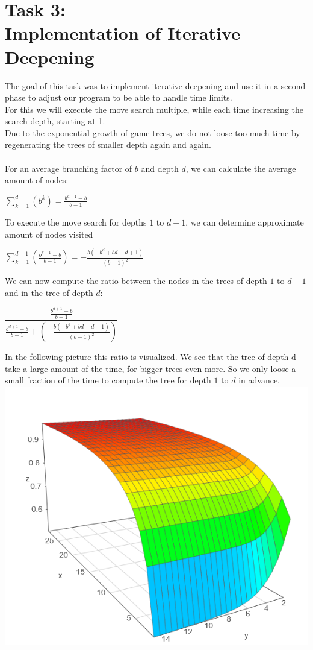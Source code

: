\section{Task 3: \\ Implementation of Iterative Deepening}
The goal of this task was to implement iterative deepening and use it in a second phase to adjust our program to be able to handle time limits.\\
For this we will execute the move search multiple, while each time increasing the search depth, starting at 1.\\
Due to the exponential growth of game trees, we do not loose too much time by regenerating the trees of smaller depth again and again.\\\\
For an average branching factor of $b$ and depth $d$, we can calculate the average amount of nodes:\\
\begin{center}
	${\displaystyle \sum_{k=1}^{d}(b^{k})} = \frac{b^{d+1}-b}{b-1}$
\end{center}
To execute the move search for depths $1$ to $d-1$, we can determine approximate amount of nodes visited \\
\begin{center}
	${\displaystyle \sum_{k=1}^{d-1}(\frac{b^{k+1}-b}{b-1})} = -\frac{b(-b^{d}+bd-d+1)}{(b-1)^{2}}$
\end{center}
We can now compute the ratio between the nodes in the trees of depth $1$ to $d-1$ and in the tree of depth $d$:
\begin{center}
	${\displaystyle \dfrac{\frac{b^{d+1}-b}{b-1}}{\frac{b^{d+1}-b}{b-1}+(-\frac{b(-b^{d}+bd-d+1)}{(b-1)^{2}})}}$
\end{center}
In the following picture this ratio is visualized. We see that the tree of depth d take a large amount of the time, for bigger trees even more. So we only loose a small fraction of the time to compute the tree for depth $1$ to $d$ in advance.\\

\includegraphics{deepening}

